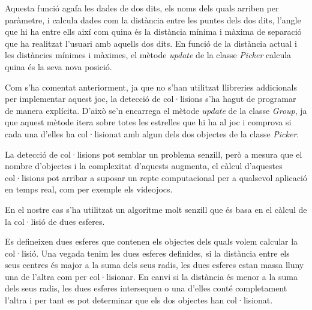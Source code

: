 \documentclass[12pt,a4paper,catalan]{article}
\begin{document}
	Aquesta funció agafa les dades de dos dits, els noms dels quals arriben per paràmetre, i calcula dades com la distància entre les puntes dels dos dits, l'angle que hi ha entre ells així com quina és la distància mínima i màxima de separació que ha realitzat l'usuari amb aquells dos dits.
	En funció de la distància actual i les distàncies mínimes i màximes, el mètode \textit{update} de la classe \textit{Picker} calcula quina és la seva nova posició.
	
	Com s'ha comentat anteriorment, ja que no s'han utilitzat llibreries addicionals per implementar aquest joc, la detecció de col·lisions s'ha hagut de programar de manera explícita. D'això se'n encarrega el mètode \textit{update} de la classe \textit{Group}, ja que aquest mètode itera sobre totes les estrelles que hi ha al joc i comprova si cada una d'elles ha col·lisionat amb algun dels dos objectes de la classe \textit{Picker}.
	
	La detecció de col·lisions pot semblar un problema senzill, però a mesura que el nombre d'objectes i la complexitat d'aquests augmenta, el càlcul d'aquestes col·lisions pot arribar a suposar un repte computacional per a qualsevol aplicació en temps real, com per exemple els videojocs.
	
	En el nostre cas s'ha utilitzat un algoritme molt senzill que és basa en el càlcul de la col·lisió de dues esferes.
	
	Es defineixen dues esferes que contenen els objectes dels quals volem calcular la col·lisió. Una vegada tenim les dues esferes definides, si la distància entre els seus centres és major a la suma dels seus radis, les dues esferes estan massa lluny una de l'altra com per col·lisionar. En canvi si la distància és menor a la suma dels seus radis, les dues esferes intersequen o una d'elles conté completament l'altra i per tant es pot determinar que els dos objectes han col·lisionat.
	
\end{document}

